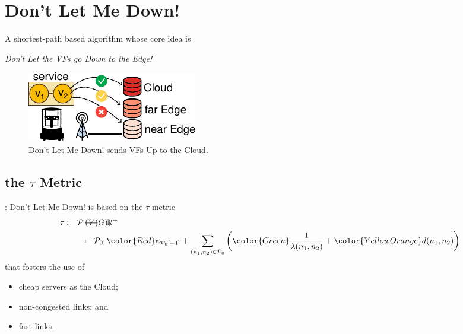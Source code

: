 \documentclass[aspectratio=169,dvipsnames]{beamer}
\begin{document}
\section{Don't Let Me Down!}
\begin{frame}{\secname}
    A shortest-path based algorithm whose core idea is
    \begin{center}
        \emph{Don't Let the VFs go Down to the Edge!}
    \end{center}
    \vfill
    
    \begin{figure}[t]%
        \includegraphics[width=0.35\columnwidth]{img/dlmd.pdf}
        \caption{Don't Let Me Down! sends VFs Up to the Cloud.}
    \end{figure}
\end{frame}

\subsection{the $\tau$ Metric}
\begin{frame}{\secname: \subsecname}
    Don't Let Me Down! is based on the $\tau$ metric
    \begin{align}
        \tau:\quad & \mathcal{P}\left( V(G)\right) \!\!\!\!\!\!\!\!\!\!\!\!\!\!\!\!\!\!\!\!\!\!\!\!\! &\longrightarrow & \quad  \mathbb{R}^+\\
                   & \qquad \mathcal{P}_0  \!\!\!\!\!\!\!\!\!\!\!\!\!\!\!\!\!\!\!\!\!\!\!\!\!\!\!\!\!\!\!\!\!\!\!\!\!\!\!&\longmapsto & \quad {\color{Red}\kappa_{\mathcal{P}_0[-1]}}
        + \sum_{(n_1,n_2)\in\mathcal{P}_0}
        \left(
            {\color{Green}\frac{1}{\lambda(n_1,n_2)}}
            + {\color{YellowOrange} d(n_1,n_2)}
        \right)
    \end{align}
    that fosters the use of
    \begin{itemize}
        \item {\color{Red} cheap servers} as the Cloud;
        \item {\color{Green} non-congested links}; and
        \item {\color{YellowOrange} fast links}.
    \end{itemize}
\end{frame}
\end{document}

